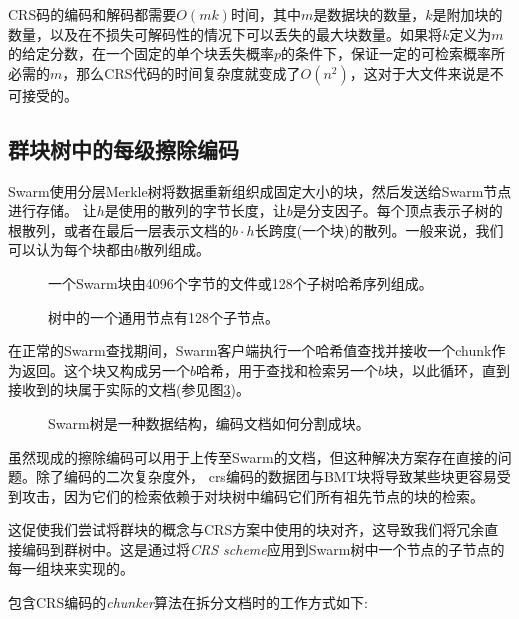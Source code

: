 CRS码的编码和解码都需要$O(mk)$时间，其中$m$是数据块的数量，$k$是附加块的数量，以及在不损失可解码性的情况下可以丢失的最大块数量。如果将$k$定义为$m$的给定分数，在一个固定的单个块丢失概率$p$的条件下，保证一定的可检索概率所必需的$m$，那么CRS代码的时间复杂度就变成了$O(n^2)$，这对于大文件来说是不可接受的。 

\subsection{群块树中的每级擦除编码\statusgreen}

Swarm使用分层Merkle树\cite{merkle1980protocols}将数据重新组织成固定大小的块，然后发送给Swarm节点进行存储。
让$h$是使用的散列的字节长度，让$b$是分支因子。每个顶点表示子树的根散列，或者在最后一层表示文档的$b\cdot h$长跨度(一个块)的散列。一般来说，我们可以认为每个块都由$b$散列组成。


\begin{figure}[htbp]
   \centering
   
   \caption[群块\statusgreen]{一个Swarm块由4096个字节的文件或128个子树哈希序列组成。}
   \label{fig:chunk}
\end{figure}


\begin{figure}[htbp]
   \centering
   
   \caption[树中的一个通用节点有128个子\statusgreen]{树中的一个通用节点有128个子节点。}
   \label{fig:Swarm-hash-basic}
\end{figure}

在正常的Swarm查找期间，Swarm客户端执行一个哈希值查找并接收一个chunk作为返回。这个块又构成另一个$b$哈希，用于查找和检索另一个$b$块，以此循环，直到接收到的块属于实际的文档(参见图\ref{fig:Swarm-hash-split})。


\begin{figure}[htbp]
   \centering
   
   \caption[Swarm哈希分裂\statusgreen]{Swarm树是一种数据结构，编码文档如何分割成块。}
   \label{fig:Swarm-hash-split}
\end{figure}

虽然现成的擦除编码可以用于上传至Swarm的文档，但这种解决方案存在直接的问题。除了编码的二次复杂度外， crs编码的数据团与BMT块将导致某些块更容易受到攻击，因为它们的检索依赖于对块树中编码它们所有祖先节点的块的检索。

这促使我们尝试将群块的概念与CRS方案中使用的块对齐，这导致我们将冗余直接编码到群树中。这是通过将\emph{CRS scheme}应用到Swarm树中一个节点的子节点的每一组块来实现的。

包含CRS编码的\emph{chunker}算法在拆分文档时的工作方式如下:

